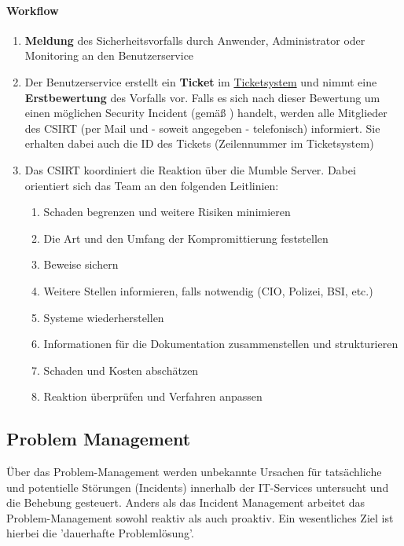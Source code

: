 \documentclass[]{article}
\let\oldparagraph\paragraph
\renewcommand{\paragraph}[1]{\oldparagraph{#1}\mbox{}}
\begin{document}
\paragraph{Workflow}\label{workflow-2}

\begin{enumerate}
\def\labelenumi{\arabic{enumi}.}
\item
  \textbf{Meldung} des Sicherheitsvorfalls durch Anwender, Administrator
  oder Monitoring an den Benutzerservice
\item
  Der Benutzerservice erstellt ein \textbf{Ticket} im
  \href{https://docs.google.com/spreadsheets/d/1GDq3AEsVDu1a-X7tEl6qKDtSZdAXm8lsRzY6Ijw-dUQ/edit\#gid=0}{Ticketsystem}
  und nimmt eine \textbf{Erstbewertung} des Vorfalls vor. Falls es sich
  nach dieser Bewertung um einen möglichen Security Incident (gemäß )
  handelt, werden alle Mitglieder des CSIRT (per Mail und - soweit
  angegeben - telefonisch) informiert. Sie erhalten dabei auch die ID
  des Tickets (Zeilennummer im Ticketsystem)
\item
  Das CSIRT koordiniert die Reaktion über die Mumble Server. Dabei
  orientiert sich das Team an den folgenden Leitlinien:

  \begin{enumerate}
  \def\labelenumii{\alph{enumii}.}
  \item
    Schaden begrenzen und weitere Risiken minimieren
  \item
    Die Art und den Umfang der Kompromittierung feststellen
  \item
    Beweise sichern
  \item
    Weitere Stellen informieren, falls notwendig (CIO, Polizei, BSI,
    etc.)
  \item
    Systeme wiederherstellen
  \item
    Informationen für die Dokumentation zusammenstellen und
    strukturieren
  \item
    Schaden und Kosten abschätzen
  \item
    Reaktion überprüfen und Verfahren anpassen
  \end{enumerate}
\end{enumerate}

\subsection{Problem Management}\label{problem-management}

Über das Problem-Management werden unbekannte Ursachen für tatsächliche
und potentielle Störungen (Incidents) innerhalb der IT-Services
untersucht und die Behebung gesteuert. Anders als das Incident
Management arbeitet das Problem-Management sowohl reaktiv als auch
proaktiv. Ein wesentliches Ziel ist hierbei die 'dauerhafte
Problemlösung'.
\end{document}
